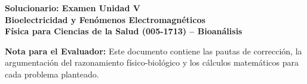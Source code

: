 \documentclass[11pt,letterpaper]{article}
\begin{document}
\begin{center}
    \textbf{\Large Solucionario: Examen Unidad V}\\
    \textbf{\large Bioelectricidad y Fenómenos Electromagnéticos}\\
    \vspace{0.2cm}
    \textbf{Física para Ciencias de la Salud (005-1713) -- Bioanálisis}\\
\end{center}

\vspace{0.2cm}

\textbf{Nota para el Evaluador:} Este documento contiene las pautas de corrección, la argumentación del razonamiento físico-biológico y los cálculos matemáticos para cada problema planteado.

\vspace{0.2cm}
\end{document}
